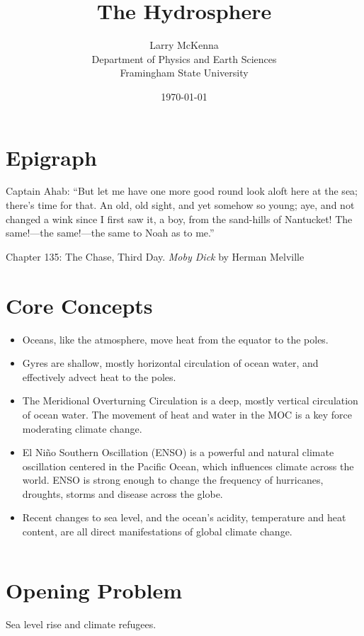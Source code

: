 \documentclass[amstex,12pt]{book}
\begin{document}
\title{The Hydrosphere}\label{chap:7_Hydrosphere}
\date{\today}
\author{Larry McKenna\\Department of Physics and Earth Sciences\\Framingham State University}
\maketitle
\section*{Epigraph}
\epigraph{Captain Ahab: ``But let me have one more good round look aloft here at the sea; there's time for that. An old, old sight, and yet somehow so young; aye, and not changed a wink since I first saw it, a boy, from the sand-hills of Nantucket! The same!---the same!---the same to Noah as to me.''}{Chapter 135: The Chase, Third Day. \textit{Moby Dick} by Herman Melville } 

\section{Core Concepts}
\begin{itemize}
	\item	Oceans, like the atmosphere, move heat from the equator to the poles.
	\item	Gyres are shallow, mostly horizontal circulation of ocean water, and effectively advect heat to the poles.
	\item The Meridional Overturning Circulation is a deep, mostly vertical circulation of ocean water. The movement of heat and water in the MOC is a key force moderating climate change.
	\item	El Ni\~no Southern Oscillation (ENSO) is a powerful and natural climate oscillation centered in the Pacific Ocean, which influences climate across the world. ENSO is strong enough to change the frequency of hurricanes, droughts, storms and disease across the globe.    
	\item	Recent changes to sea level, and the ocean's acidity, temperature and heat content, are all direct manifestations of global climate change. 
\end{itemize}
$\ $\\

\section{Opening Problem}
Sea level rise and climate refugees. 
$\ $\\
\end{document}
